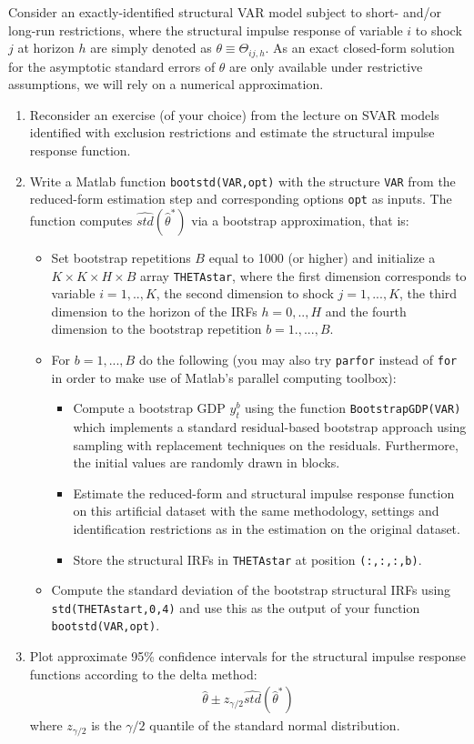 \documentclass{article}
\begin{document}
Consider an exactly-identified structural VAR model subject to short- and/or long-run restrictions, where the structural impulse response of variable $i$ to shock $j$ at horizon $h$ are simply denoted as $\theta \equiv \Theta_{ij,h}$. As an exact closed-form solution for the asymptotic standard errors of $\theta$ are only available under restrictive assumptions, we will rely on a numerical approximation.
\begin{enumerate}
	\item Reconsider an exercise (of your choice) from the lecture on SVAR models identified with exclusion restrictions and estimate the structural impulse response function.
	\item Write a Matlab function \texttt{bootstd(VAR,opt)} with the structure \texttt{VAR} from the reduced-form estimation step and corresponding options \texttt{opt} as inputs. The function computes $\widehat{std}(\hat{\theta}^\ast)$ via a bootstrap approximation, that is:
\begin{itemize}
	\item Set bootstrap repetitions $B$ equal to 1000 (or higher) and initialize a $K \times K \times H \times B$ array \texttt{THETAstar}, where the first dimension corresponds to variable $i=1,..,K$, the second dimension to shock $j=1,...,K$, the third dimension to the horizon of the IRFs $h=0,..,H$ and the fourth dimension to the bootstrap repetition $b=1.,...,B$.
	\item For $b=1,...,B$ do the following (you may also try \texttt{parfor} instead of \texttt{for} in order to make use of Matlab's parallel computing toolbox):
	\begin{itemize}
		\item Compute a bootstrap GDP $y_t^{b}$ using the function \texttt{BootstrapGDP(VAR)} which implements a standard residual-based bootstrap approach using sampling with replacement techniques on the residuals. Furthermore, the initial values are randomly drawn in blocks.
		\item Estimate the reduced-form and structural impulse response function on this artificial dataset with the same methodology, settings and identification restrictions as in the estimation on the original dataset.
		\item Store the structural IRFs in \texttt{THETAstar} at position \texttt{(:,:,:,b)}.

	\end{itemize}	
	\item Compute the standard deviation of the bootstrap structural IRFs using \texttt{std(THETAstart,0,4)} and use this as the output of your function \texttt{bootstd(VAR,opt)}.
\end{itemize}
\item Plot approximate 95\% confidence intervals for the structural impulse response functions according to the delta method:
\begin{align*}
\hat{\theta} \pm z_{\gamma/2} \widehat{std}(\hat{\theta}^\ast) \label{eq:deltairf}
\end{align*}
where $z_{\gamma/2}$ is the $\gamma/2$ quantile of the standard normal distribution.
\end{enumerate}
\end{document}
